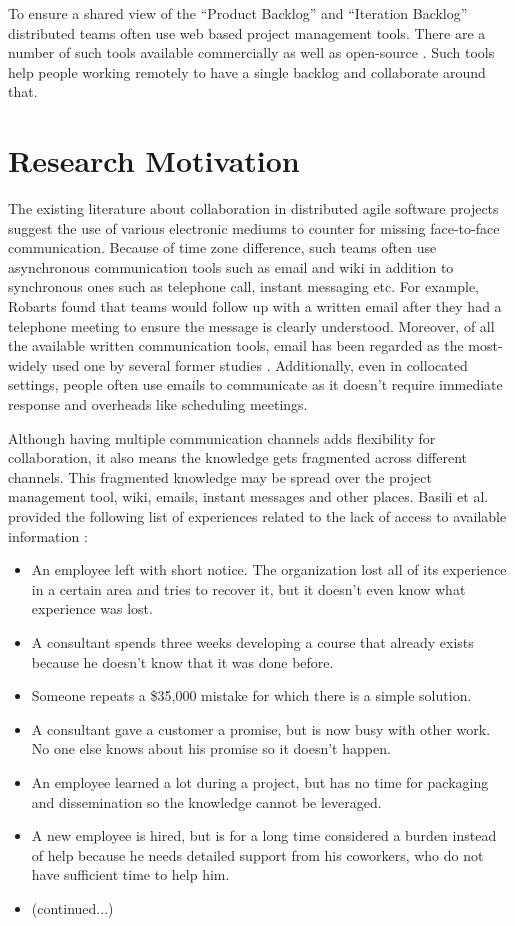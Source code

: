 To ensure a shared view of the ``Product Backlog'' and ``Iteration Backlog'' distributed teams often use web based project management tools. There are a number of such tools available commercially as well as open-source \cite{scrum_pad, version_one, xplanner, trac}. Such tools help people working remotely to have a single backlog and collaborate around that. 

\section{Research Motivation}
The existing literature about collaboration in distributed agile software projects suggest the use of various electronic mediums to counter for missing face-to-face communication. Because of time zone difference, such teams often use asynchronous communication tools such as email and wiki in addition to synchronous ones such as telephone call, instant messaging etc. For example, Robarts \cite{practical_considerations} found that teams would follow up with a written email after they had a telephone meeting to ensure the message is clearly understood. Moreover, of all the available written communication tools, email has been regarded as the most-widely used one by several former studies \cite{collaboration_in} \cite{on_coord}. Additionally, even in collocated settings, people often use emails to communicate as it doesn't require immediate response and overheads like scheduling meetings.

Although having multiple communication channels adds flexibility for collaboration, it also means the knowledge gets fragmented across different channels. This fragmented knowledge may be spread over the project management tool, wiki, emails, instant messages and other places. Basili et al. provided the following list of experiences related to the lack of access to available information \cite{implementing_an_experience}:

\begin{itemize}
	\item An employee left with short notice. The organization lost all of its experience in a certain area and tries to recover it, but it doesn't even know what experience was lost.
	
	\item A consultant spends three weeks developing a course that already exists because he doesn't know that it was done before.
	\item Someone repeats a \$35,000 mistake for which there is a simple solution.
	\item A consultant gave a customer a promise, but is now busy with other work. No one else knows about his promise so it doesn't happen.
	\item An employee learned a lot during a project, but has no time for packaging and dissemination so the knowledge cannot be leveraged.
	\item A new employee is hired, but is for a long time considered a burden instead of help because he needs detailed support from his coworkers, who do not have sufficient time to help him.
	\item (continued...)
\end{itemize}

